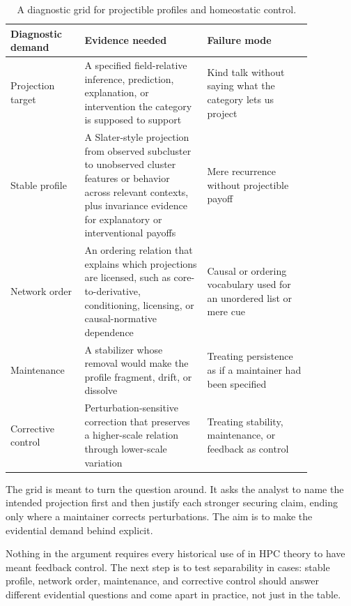 \documentclass[12pt]{article}
\begin{document}
\begin{table}[H]
\centering
\small
\begin{tabular}{>{\raggedright\arraybackslash}p{0.21\linewidth}
                >{\raggedright\arraybackslash}p{0.35\linewidth}
                >{\raggedright\arraybackslash}p{0.30\linewidth}}
\toprule
Diagnostic demand & Evidence needed & Failure mode \\
\midrule
Projection target & A specified field-relative inference, prediction,
explanation, or intervention the category is supposed to support & Kind talk
without saying what the category lets us project \\
Stable profile & A Slater-style projection from observed subcluster to
unobserved cluster features or behavior across relevant contexts, plus invariance
evidence for explanatory or interventional payoffs & Mere recurrence without
projectible payoff \\
Network order & An ordering relation that explains which projections are
licensed, such as core-to-derivative, conditioning, licensing, or
causal-normative dependence & Causal or ordering vocabulary used for an unordered
list or mere cue \\
Maintenance & A stabilizer whose removal would make the profile fragment, drift,
or dissolve & Treating persistence as if a maintainer had been specified \\
Corrective control & Perturbation-sensitive correction that preserves a
higher-scale relation through lower-scale variation & Treating stability,
maintenance, or feedback as control \\
\bottomrule
\end{tabular}
\caption{A diagnostic grid for projectible profiles and homeostatic control.}
\label{tab:diagnostics}
\end{table}

The grid is meant to turn the question around. It asks the analyst to name the
intended projection first and then justify each stronger securing claim, ending
only where a maintainer corrects perturbations. The aim is to make the evidential
demand behind  explicit.

Nothing in the argument requires every historical use of  in
HPC theory to have meant feedback control. The next step is to test separability
in cases: stable profile, network order, maintenance, and corrective control
should answer different evidential questions and come apart in practice, not just
in the table.
\end{document}
